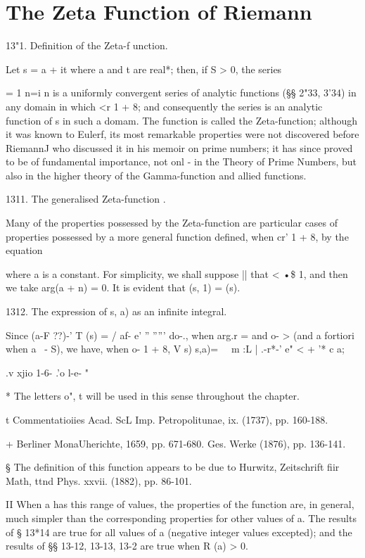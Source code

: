 \chapter{The Zeta Function of Riemann}

13"1. Definition of the Zeta-f unction.

Let s = a + it where a and t are real*; then, if S > 0, the series

= 1 n=i n is a uniformly convergent series of analytic functions (§§
2"33, 3'34) in any domain in which <r 1 + 8; and consequently the
series is an analytic function of s in such a domam. The function is
called the Zeta-function; although it was known to Eulerf, its most
remarkable properties were not discovered before RiemannJ who
discussed it in his memoir on prime numbers; it has since proved to
be of fundamental importance, not onl - in the Theory of Prime
Numbers, but also in the higher theory of the Gamma-function and
allied functions.

1311. The generalised Zeta-function .

Many of the properties possessed by the Zeta-function are particular
cases of properties possessed by a more general function defined, when
cr' 1 + 8, by the equation

where a is a constant. For simplicity, we shall suppose || that < •\$
1, and then we take arg(a + n) = 0. It is evident that (s, 1) = (s).

1312. The expression of s, a) as an infinite integral.

Since (a-F ??)-' T (s) = / af- e' '' ''''' do-., when arg.r = and o- >
(and a fortiori when a \ - S), we have, when o- 1 + 8, V s) s,a)= \ \
m :L | .-r*-' e" < + '* c a;

.v xjio 1-6- .'o l-e- "

* The letters o", t will be used in this sense throughout the chapter.

t Commentatioiies Acad. ScL Imp. Petropolitunae, ix. (1737), pp.
160-188.

+ Berliner MonaUherichte, 1659, pp. 671-680. Ges. Werke (1876), pp.
136-141.

§ The definition of this function appears to be due to Hurwitz,
Zeitschrift fiir Math, ttnd Phys. xxvii. (1882), pp. 86-101.

II When a has this range of values, the properties of the function
are, in general, much simpler than the corresponding properties for
other values of a. The results of § 13*14 are true for all values of a
(negative integer values excepted); and the results of §§ 13-12,
13-13, 13-2 are true when R (a) > 0.

